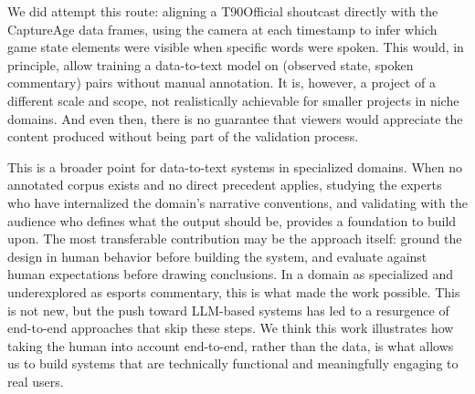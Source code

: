 We did attempt this route: aligning a T90Official shoutcast directly with the CaptureAge data frames, using the camera at each timestamp to infer which game state elements were visible when specific words were spoken. This would, in principle, allow training a data-to-text model on (observed state, spoken commentary) pairs without manual annotation. It is, however, a project of a different scale and scope, not realistically achievable for smaller projects in niche domains. And even then, there is no guarantee that viewers would appreciate the content produced without being part of the validation process.

This is a broader point for data-to-text systems in specialized domains. When no annotated corpus exists and no direct precedent applies, studying the experts who have internalized the domain's narrative conventions, and validating with the audience who defines what the output should be, provides a foundation to build upon. The most transferable contribution may be the approach itself: ground the design in human behavior before building the system, and evaluate against human expectations before drawing conclusions. In a domain as specialized and underexplored as esports commentary, this is what made the work possible. This is not new, but the push toward LLM-based systems has led to a resurgence of end-to-end approaches that skip these steps. We think this work illustrates how taking the human into account end-to-end, rather than the data, is what allows us to build systems that are technically functional and meaningfully engaging to real users.
